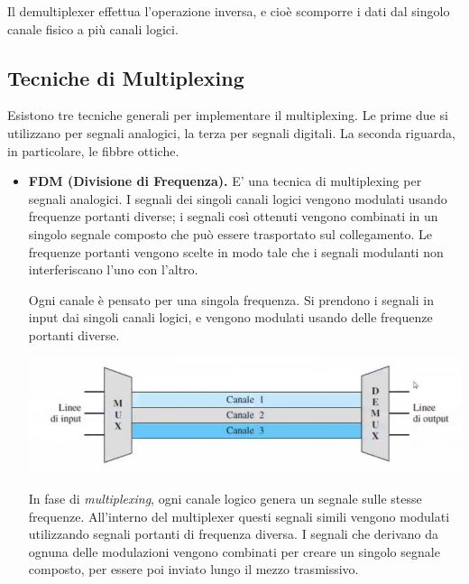     Il demultiplexer effettua l'operazione inversa, e cioè scomporre i dati dal singolo canale fisico a più canali logici.
    
    \subsection{Tecniche di Multiplexing}
        Esistono tre tecniche generali per implementare il multiplexing. Le prime due si utilizzano per segnali analogici, la terza per segnali digitali. La seconda riguarda, in particolare, le fibbre ottiche.
    
        \begin{itemize}
            \item 
                \textbf{FDM (Divisione di Frequenza).} E' una tecnica di multiplexing per  segnali analogici. I segnali dei singoli canali logici vengono modulati usando frequenze portanti diverse; i segnali così ottenuti vengono combinati in un singolo segnale composto che può essere trasportato sul collegamento. Le frequenze portanti vengono scelte in modo tale che i segnali modulanti non interferiscano l'uno con l'altro.
                
                Ogni canale è pensato per una singola frequenza. Si prendono i segnali in input dai singoli canali logici, e vengono modulati usando delle frequenze portanti diverse.
                
                \begin{center}
                    \includegraphics[scale=0.6]{images/FDM.png}
                \end{center}
                
                In fase di \textit{multiplexing}, ogni canale logico genera un segnale sulle stesse frequenze. All'interno del multiplexer questi segnali simili vengono modulati utilizzando segnali portanti di frequenza diversa. I segnali che derivano da ognuna delle modulazioni vengono combinati per creare un singolo segnale composto, per essere poi inviato lungo il mezzo trasmissivo.
                

\end{itemize}
